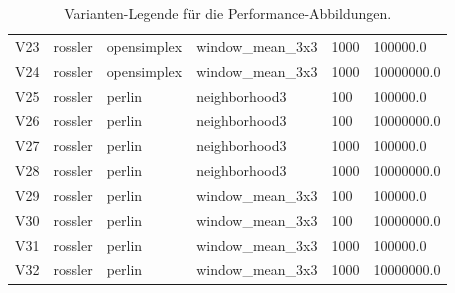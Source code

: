 \begin{table}[htbp]
\begin{tabular}{llllll}
    V23 & rossler & opensimplex & window_mean_3x3 & 1000 & 100000.0 \\
    V24 & rossler & opensimplex & window_mean_3x3 & 1000 & 10000000.0 \\
    V25 & rossler & perlin & neighborhood3 & 100 & 100000.0 \\
    V26 & rossler & perlin & neighborhood3 & 100 & 10000000.0 \\
    V27 & rossler & perlin & neighborhood3 & 1000 & 100000.0 \\
    V28 & rossler & perlin & neighborhood3 & 1000 & 10000000.0 \\
    V29 & rossler & perlin & window_mean_3x3 & 100 & 100000.0 \\
    V30 & rossler & perlin & window_mean_3x3 & 100 & 10000000.0 \\
    V31 & rossler & perlin & window_mean_3x3 & 1000 & 100000.0 \\
    V32 & rossler & perlin & window_mean_3x3 & 1000 & 10000000.0 \\
    \hline
  \end{tabular}
  \caption{Varianten-Legende für die Performance-Abbildungen.}
  \label{tab:perf:variant-legend}
\end{table}